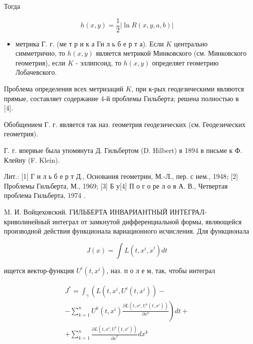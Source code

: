 \documentclass[10pt]{article}
\begin{document}
Тогда



\[

h(x, y)=\frac{1}{2}|\ln R(x, y, a, b)|

\]



\begin{itemize}

  \item метрика Г. г. (ме т р и к а Ги л ь б е р т а). Если $K$ центрально симметрично, то $h(x, y)$ является метрикой Минковского (см. Минковского геометрия), если $K$ - эллипсоид, то $h(x, y)$ определяет геометрию Лобачевского.

\end{itemize}



Проблема определения всех метризаций $K$, при к-рых геодезическими являются прямые, составляет содержание 4-й проблемы Гильберта; решена полностью в [4].



Обобщением Г. г. является так наз. геометрия геодезических (см. Геодезических геометрия).



Г. г. впервые была упомянута Д. Гильбертом (D. Hilbert) в 1894 в письме к Ф. Клейну (F. Klein).



Лит.: [1] Г и л ь б е р т Д., Основания геометрии, М.-Л., пер. с нем., 1948; [2] Проблемы Гильберта, М., 1969; [3] Б у[4] П о г о ре л о в А. В., Четвертая проблема Гильберта, 1974 .



M. И. Войцеховский. ГИЛЬБЕРТА ИНВАРИАНТНЫЙ ИНТЕГРАЛ-криволинейный интеграл от замкнутой дифференциальной формы, являющейся производной действия функционала вариационного исчисления. Для функционала



\[

J(x)=\int L\left(t, x^{i}, \dot{x}^{i}\right) d t

\]



ищется вектор-функция $U^{i}\left(t, x^{i}\right)$, наз. п о л е м, так, чтобы интеграл



\[

\begin{gathered}

J^{*}=\int_{\gamma}\left(L\left(t, x^{i}, U^{i}\left(t, x^{i}\right)\right)-\right. \\

\left.-\sum_{k=1}^{n} U^{k}\left(t, x^{i}\right) \frac{\partial L\left(t, x^{i}, U^{i}\left(t, x^{i}\right)\right)}{\partial x^{k}}\right) d t+ \\

+\sum_{k=1}^{n} \frac{\partial L\left(t, x^{i}, U^{i}\left(t, x^{i}\right)\right)}{\partial \dot{x}^{k}} d x^{k}

\end{gathered}

\]
\end{document}
